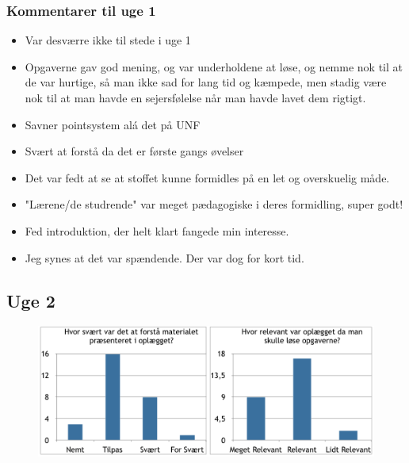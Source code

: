 \documentclass{article}
\begin{document}
    \subsubsection{Kommentarer til uge 1}
    \begin{itemize}
        \item Var desværre ikke til stede i uge 1

        \item Opgaverne gav god mening, og var underholdene at løse, og nemme
              nok til at de var hurtige, så man ikke sad for lang tid og
              kæmpede, men stadig være nok til at man havde en sejersfølelse når
              man havde lavet dem rigtigt.
        \item Savner pointsystem alá det på UNF
        \item Svært at forstå da det er første gangs øvelser
        \item Det var fedt at se at stoffet kunne formidles på en let og
              overskuelig måde.

        \item "Lærene/de studrende" var meget pædagogiske i deres formidling,
              super godt!

        \item Fed introduktion, der helt klart fangede min interesse.

        \item Jeg synes at det var spændende. Der var dog for kort tid.
    \end{itemize}
\newpage
    \subsection{Uge 2}
    \begin{figure}[h!]
        \centering
        \includegraphics[width=1\textwidth]{include/uge2-1.png}
    \end{figure}
\end{document}
